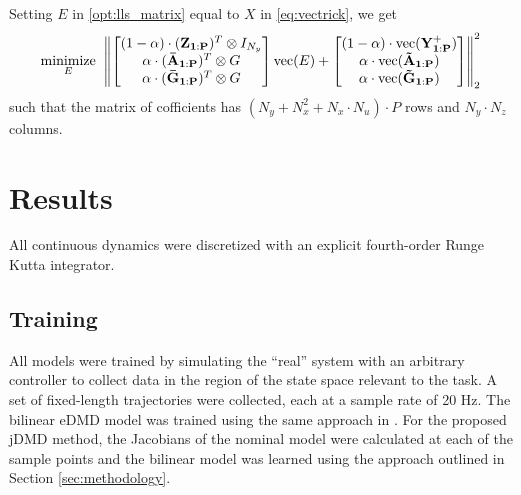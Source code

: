 \documentclass{article}
\begin{document}
  Setting $E$ in \eqref{opt:lls_matrix} equal to $X$ in \eqref{eq:vectrick}, we get
  \begin{align} \label{opt:lls_matrix}
      \underset{E}{\text{minimize}} \;\;  
      \norm{
          \begin{bmatrix}
              (1-\alpha)\cdot(\mathbf{Z_{1:P}})^T \otimes I_{N_y} \\
              \alpha\cdot(\mathbf{\bar{A}_{1:P}})^T \otimes G \\
              \alpha\cdot(\mathbf{\bar{G}_{1:P}})^T \otimes G \\
          \end{bmatrix}
          \text{vec}(E)
          +
          \begin{bmatrix}
              (1-\alpha)\cdot\text{vec}(\mathbf{Y^+_{1:P}}) \\
              \alpha\cdot\text{vec}(\mathbf{\tilde{A}_{1:P}}) \\
              \alpha\cdot\text{vec}(\mathbf{\tilde{G}_{1:P}})
          \end{bmatrix}
      }_2^2
  \end{align}
  such that the matrix of cofficients has $(N_y + N_x^2 + N_x \cdot N_u) \cdot P$ rows and 
  $N_y \cdot N_z$ columns.

\section{Results} \label{sec:results}
All continuous dynamics were discretized with an explicit fourth-order Runge Kutta 
integrator.

\subsection{Training}

All models were trained by simulating the ``real'' system with an arbitrary controller to 
collect data in the region of the state space relevant to the task. A set of fixed-length 
trajectories were collected, each at a sample rate of 20 Hz. The bilinear eDMD model was
trained using the same approach in \cite{Folkestad2021}. For the proposed jDMD method, the
Jacobians of the nominal model were calculated at each of the sample points and the bilinear
model was learned using the approach outlined in Section \ref{sec:methodology}.
\end{document}
